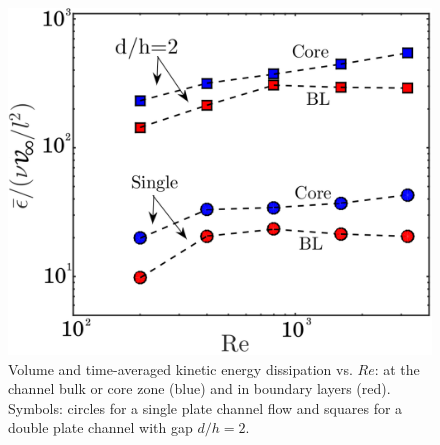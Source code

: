 \documentclass[aps,pre,twocolumn,aps,longbibliography]{revtex4-1}
\begin{document}
	\begin{figure}
		\begin{minipage}[c]{1\linewidth}
			\includegraphics[width=0.95\linewidth]{Fig19.pdf} 
		\end{minipage} 
		\caption{Volume and time-averaged kinetic energy dissipation vs. $Re$: at the channel bulk or core zone (blue) and in boundary layers (red). Symbols: circles for a single plate channel flow and squares for a double plate channel with gap $d/h=2$.}
		\label{fig:core_BL_vs_Re} 
	\end{figure}
	
\end{document}
